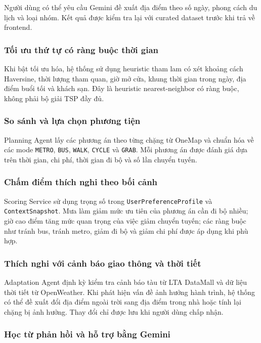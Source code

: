 \documentclass[12pt,a4paper]{article}
\begin{document}
Người dùng có thể yêu cầu Gemini đề xuất địa điểm theo số ngày, phong cách du lịch và loại nhóm. Kết quả được kiểm tra lại với curated dataset trước khi trả về frontend.

\subsubsection{Tối ưu thứ tự có ràng buộc thời gian}

Khi bật tối ưu hóa, hệ thống sử dụng heuristic tham lam có xét khoảng cách Haversine, thời lượng tham quan, giờ mở cửa, khung thời gian trong ngày, địa điểm buổi tối và khách sạn. Đây là heuristic nearest-neighbor có ràng buộc, không phải bộ giải TSP đầy đủ.

\subsubsection{So sánh và lựa chọn phương tiện}

Planning Agent lấy các phương án theo từng chặng từ OneMap và chuẩn hóa về các mode \texttt{METRO}, \texttt{BUS}, \texttt{WALK}, \texttt{CYCLE} và \texttt{GRAB}. Mỗi phương án được đánh giá dựa trên thời gian, chi phí, thời gian đi bộ và số lần chuyển tuyến.

\subsubsection{Chấm điểm thích nghi theo bối cảnh}

Scoring Service sử dụng trọng số trong \texttt{UserPreferenceProfile} và \texttt{ContextSnapshot}. Mưa làm giảm mức ưu tiên của phương án cần đi bộ nhiều; giờ cao điểm tăng mức quan trọng của việc giảm chuyển tuyến; các ràng buộc như tránh bus, tránh metro, giảm đi bộ và giảm chi phí được áp dụng khi phù hợp.

\subsubsection{Thích nghi với cảnh báo giao thông và thời tiết}

Adaptation Agent định kỳ kiểm tra cảnh báo tàu từ LTA DataMall và dữ liệu thời tiết từ OpenWeather. Khi phát hiện vấn đề ảnh hưởng hành trình, hệ thống có thể đề xuất đổi địa điểm ngoài trời sang địa điểm trong nhà hoặc tính lại chặng bị ảnh hưởng. Thay đổi chỉ được lưu khi người dùng chấp nhận.

\subsubsection{Học từ phản hồi và hỗ trợ bằng Gemini}
\end{document}
